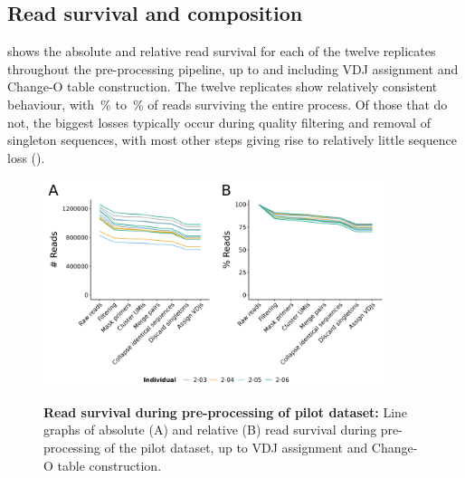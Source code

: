 \subsection{Read survival and composition}
\label{sec:igseq_pilot_composition}

 shows the absolute and relative read survival for each of the twelve replicates throughout the pre-processing pipeline, up to and including VDJ assignment and Change-O table construction. The twelve replicates show relatively consistent behaviour, with \,\% to \,\% of reads surviving the entire process. Of those that do not, the biggest losses typically occur during quality filtering and removal of singleton sequences, with most other steps giving rise to relatively little sequence loss ().

\begin{figure}
\centering
\includegraphics[width = 0.9\textwidth]{_Figures/png/pilot-read-survival-init.png}
\begin{subfigure}{0em}
\label{fig:igseq-pilot-read-survival-init-a}
\end{subfigure}
\begin{subfigure}{0em}
\label{fig:igseq-pilot-read-survival-init-b}
\end{subfigure}
\caption[Read survival during pre-processing of \igseq pilot dataset, part 1]{\textbf{Read survival during pre-processing of \igseq pilot dataset:} Line graphs of absolute (A) and relative (B) read survival during pre-processing of the pilot \igseq dataset, up to VDJ assignment and Change-O table construction.}
\label{fig:igseq-pilot-read-survival-init}
\end{figure}

